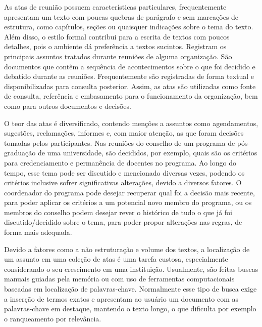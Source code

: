 

As atas de reunião possuem características particulares, frequentemente apresentam um texto com poucas quebras de parágrafo e sem marcações de estrutura, como capítulos, seções ou quaisquer indicações sobre o tema do texto. Além disso, o estilo formal contribui para a escrita de textos com poucos detalhes, pois o ambiente dá preferência a textos sucintos. Registram os principais assuntos tratados durante reuniões de alguma organização. São documentos que contêm a sequência de acontecimentos sobre o que foi decidido e debatido durante as reuniões. Frequentemente são registradas de forma textual e disponibilizadas para consulta posterior. Assim, as atas são utilizadas como fonte de consulta, referência e embasamento para o funcionamento da organização, bem como para outros documentos e decisões.




O teor das atas é diversificado, contendo menções a assuntos como agendamentos, sugestões, reclamações, informes e, com maior atenção, as que foram decisões tomadas pelos participantes. Nas reuniões do conselho de um programa de pós-graduação de uma universidade, são decididos, por exemplo, quais são os critérios para credenciamento e permanência de docentes no programa. Ao longo do tempo, esse tema pode ser discutido e mencionado diversas vezes, podendo os critérios inclusive sofrer significativas alterações, devido a diversos fatores. O coordenador do programa pode desejar recuperar qual foi a decisão mais recente, para poder aplicar os critérios a um potencial novo membro do programa, ou os membros do conselho podem desejar rever o histórico de tudo o que já foi discutido/decidido sobre o tema, para poder propor alterações nas regras, de forma mais adequada.




Devido a fatores como a não estruturação e volume dos textos, a localização de um assunto em uma coleção de atas é uma tarefa custosa, especialmente considerando o seu crescimento em uma instituição. Usualmente, são feitas buscas manuais guiadas pela memória ou com uso de ferramentas computacionais baseadas em localização de palavras-chave. Normalmente esse tipo de busca exige a inserção de termos exatos e apresentam ao usuário um documento com as palavras-chave em destaque, mantendo o texto longo, o que dificulta por exemplo o ranqueamento por relevância. 

